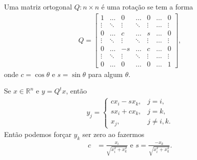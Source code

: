 \documentclass[a4paper,12pt, leqno, answers]{exam}
\begin{document}
\begin{questions}
\begin{solution}
        Uma matriz ortogonal $Q : n \times n$ \'{e} uma rota\c{c}\~{a}o se tem a forma
        \begin{align*}
            Q = \begin{bmatrix}
                1      & \ldots & 0      & \ldots & 0       & \ldots & 0       \\
                \vdots & \ddots & \vdots & \ddots & \vdots  & \ldots & \vdots  \\
                0      & \ldots & c      & \ldots &  s      & \ldots & 0       \\
                \vdots & \ddots & \vdots & \ddots & \vdots  & \ldots & \vdots  \\
                0      & \ldots & -s     & \ldots &  c      & \ldots & 0       \\
                \vdots & \ddots & \vdots & \ddots & \vdots  & \ldots & \vdots  \\
                0      & \ldots & 0      & \ldots & 0       & \ldots & 1 
            \end{bmatrix},
        \end{align*}
        onde $c = \cos \theta$ e $s = \sin \theta$ para algum $\theta$.

        Se $x \in \mathbb{R}^n$ e $y = Q^t x$, ent\~{a}o
        \begin{align*}
            y_j = \begin{cases}
                c x_i - s x_k, & j = i, \\
                s x_i + c x_k, & j = k, \\
                x_j, & j \neq i, k.
            \end{cases}
        \end{align*}
        Ent\~{a}o podemos for\c{c}ar $y_k$ ser zero ao fazermos
        \begin{align*}
            c &= \frac{x_i}{\sqrt{x_i^2 + x_k^2}} \text{ e } s = \frac{-x_k}{\sqrt{x_i^2 + x_k^2}}.
        \end{align*}
    \end{solution}


\end{questions}
\end{document}
